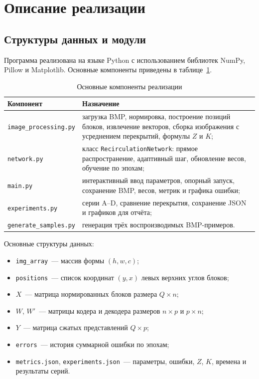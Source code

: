 \section{Описание реализации}
\label{sec:impl}

\subsection{Структуры данных и модули}

Программа реализована на языке Python с использованием библиотек NumPy, Pillow и Matplotlib. Основные компоненты приведены в таблице~\ref{tab:modules}.

\begin{table}[H]
	\centering
	\caption{Основные компоненты реализации}
	\label{tab:modules}
	\begin{tabularx}{\textwidth}{@{}lX@{}}
		\hline
		Компонент & Назначение \\
		\hline
		\texttt{image\_processing.py} & загрузка BMP, нормировка, построение позиций блоков, извлечение векторов, сборка изображения с усреднением перекрытий, формулы $Z$ и $K$; \\
		\texttt{network.py} & класс \texttt{RecirculationNetwork}: прямое распространение, адаптивный шаг, обновление весов, обучение по эпохам; \\
		\texttt{main.py} & интерактивный ввод параметров, опорный запуск, сохранение BMP, весов, метрик и графика ошибки; \\
		\texttt{experiments.py} & серии A--D, сравнение перекрытия, сохранение JSON и графиков для отчёта; \\
		\texttt{generate\_samples.py} & генерация трёх воспроизводимых BMP-примеров. \\
		\hline
	\end{tabularx}
\end{table}

Основные структуры данных:
\begin{itemize}
	\item \texttt{img\_array}~--- массив формы $(h,w,c)$;
	\item \texttt{positions}~--- список координат $(y,x)$ левых верхних углов блоков;
	\item $X$~--- матрица нормированных блоков размера $Q \times n$;
	\item $W$, $W'$~--- матрицы кодера и декодера размеров $n \times p$ и $p \times n$;
	\item $Y$~--- матрица сжатых представлений $Q \times p$;
	\item \texttt{errors}~--- история суммарной ошибки по эпохам;
	\item \texttt{metrics.json}, \texttt{experiments.json}~--- параметры, ошибки, $Z$, $K$, времена и результаты серий.
\end{itemize}

